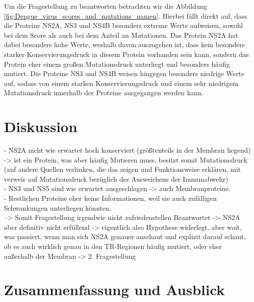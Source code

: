 \documentclass[german,version-2022-01]{uzl-thesis}
\begin{document}
Um die Fragestellung zu beantworten betrachten wir die Abbildung \ref{fig:Dengue_virus_scores_and_mutations_namen}. Hierbei f\"allt direkt auf, dass die Proteine NS2A, NS3 und NS4B besonders extreme Werte aufweisen, sowohl bei dem Score als auch bei dem Anteil an Mutationen. Das Protein NS2A hat dabei besonders hohe Werte, weshalb davon auszugehen ist, dass kein besonders starker Konservierungsdruck in diesem Protein vorhanden sein kann, sondern das Protein eher einem gro\ss{}en Mutationsdruck unterliegt und besonders h\"aufig mutiert. Die Proteine NS3 und NS4B weisen hingegen besonders niedrige Werte auf, sodass von einem starken Konservierungsdruck und einem sehr niedrigem Mutationsdruck innerhalb der Proteine ausgegangen werden kann. 


\chapter{Diskussion}
- NS2A nicht wie erwartet hoch konserviert (gr\"o\ss{}tenteils in der Membran liegend) -> ist ein Protein, was aber h\"aufig Mutieren muss, besitzt somit Mutationsdruck (auf andere Quellen verlinken, die das zeigen und Funktionsweise erkl\"aren, mit verweis auf Mutationsdruck bez\"uglich des Ausweichens der Immunabwehr) \\
- NS3 und NS5 sind wie erwartet ausgeschlagen -> auch Membranproteine. \\
- Restlichen Proteine eher keine Informationen, weil sie auch zuf\"alligen Schwankungen unterliegen k\"onnten. \\
--> Somit Fragestellung irgendwie nicht zufriedenstellen Beantwortet -> NS2A aber definitiv nicht erf\"ullend -> eigentlich also Hypothese widerlegt, aber wait, was passiert, wenn man sich NS2A genauer anschaut und explizit darauf schaut, ob es auch wirklich genau in den TR-Regionen h\"aufig mutiert, oder eher au\ss{}erhalb der Membran -> 2. Fragestellung 

\chapter{Zusammenfassung und Ausblick}


%
\end{document}
